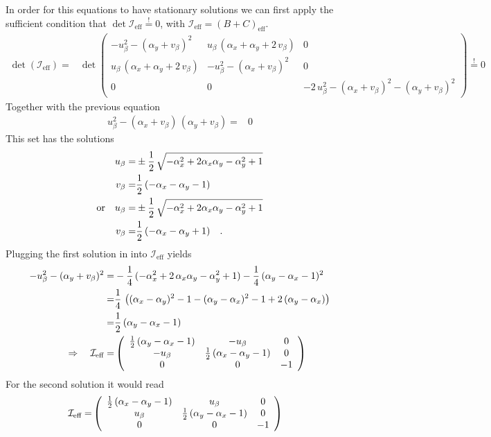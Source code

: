 \documentclass{article}
\begin{document}
In order for this equations to have stationary solutions we can first apply the sufficient condition that $\det{\mathcal{I}_\text{eff}}\overset{!}{=}0$, with $\mathcal{I}_\text{eff}=(B+C)_\text{eff}$.
\begin{align*}
    \det(\mathcal{I}_\text{eff})=&\det \left( \begin{array}{ccc}
         - u_\beta^2- (\alpha_y+v_\beta)^2& u_\beta\,(\alpha_x+\alpha_y+2\,v_\beta)&0\\
          u_\beta\,(\alpha_x+\alpha_y+2\,v_\beta)& -u_\beta^2-(\alpha_x+v_\beta)^2 &0\\
       0&0& -2\,u_\beta^2-(\alpha_x+v_\beta)^2- (\alpha_y+v_\beta)^2
    \end{array} \right)\overset{!}{=}0
\end{align*}
Together with the previous equation
\begin{align*}
    u_\beta^2-(\alpha_x+v_\beta)\,(\alpha_y+v_\beta)=&0
\end{align*}
This set has the solutions
\begin{align*}
    u_\beta =& \pm \frac{1}{2}\, \sqrt{-\alpha_x^2 + 2 \alpha_x\alpha_y - \alpha_y^2 + 1}\\
    v_\beta =& \frac{1}{2}\, (-\alpha_x - \alpha_y - 1)\\
    \text{or}\quad u_\beta =& \pm \frac{1}{2}\, \sqrt{-\alpha_x^2 + 2 \alpha_x\alpha_y - \alpha_y^2 + 1}\\
    v_\beta =& \frac{1}{2}\, (-\alpha_x - \alpha_y + 1)\quad.
\end{align*}
Plugging the first solution in into $\mathcal{I}_\text{eff}$ yields
\begin{align*}
    -u_\beta^2-(\alpha_y+v_\beta)^2=&-\frac{1}{4}\,(-\alpha_x^2+2\,\alpha_x\alpha_y-\alpha_y^2+1)-\frac{1}{4}\,(\alpha_y-\alpha_x-1)^2\\
    =&\frac{1}{4}\,\left( (\alpha_x-\alpha_y)^2-1-(\alpha_y-\alpha_x)^2-1+2\,(\alpha_y-\alpha_x)  \right)\\
    =&\frac{1}{2}\,(\alpha_y-\alpha_x-1)\\
    \Rightarrow\quad\mathcal{I}_\text{eff}=& \left( \begin{array}{ccc}
         \frac{1}{2}\,(\alpha_y-\alpha_x-1)& -u_\beta&0\\
          -u_\beta& \frac{1}{2}\,(\alpha_x-\alpha_y-1) &0\\
       0&0&-1
    \end{array} \right)
\end{align*}
For the second solution it would read
\begin{align*}
    \mathcal{I}_\text{eff}=& \left( \begin{array}{ccc}
         \frac{1}{2}\,(\alpha_x-\alpha_y-1)& u_\beta&0\\
          u_\beta& \frac{1}{2}\,(\alpha_y-\alpha_x-1) &0\\
       0&0&-1
    \end{array} \right)
\end{align*}
\end{document}
